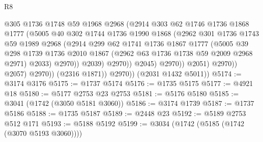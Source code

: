 \begin{lexlean}{R8}
\begin{coremodule}
                                @305
                                @1736
                                @1748
                                @59
                                @1968
                                @2968
                                (@2914
                                  @303
                                  @62
                                  @1746
                                  @1736
                                  @1868
                                  @1777
                                  (@5005
                                    @40
                                    @302
                                    @1744
                                    @1736
                                    @1990
                                    @1868
                                    (@2962
                                      @301
                                      @1736
                                      @1743
                                      @59
                                      @1989
                                      @2968
                                      (@2914
                                        @299
                                        @62
                                        @1741
                                        @1736
                                        @1867
                                        @1777
                                        (@5005
                                          @39
                                          @298
                                          @1739
                                          @1736
                                          @2010
                                          @1867
                                          (@2962 @63 @1736 @1738 @59 @2009 @2968 @2971)
                                          @2033)
                                        @2970))
                                    @2039)
                                  @2970))
                              @2045)
                            @2970))
                        @2051)
                      @2970))
                  @2057)
                @2970))
            (@2316 @1871))
          @2970))
      (@2031 @1432 @5011))
@5174 := @3174 @3176
@5175 := @1737 @5174
@5176 := @1735 @5175
@5177 := @4921 @18
@5180 := @5177 @2753 @23 @2753
@5181 := @5176 @5180
@5185 := @3041 (@1742 (@3050 @5181 @3060))
@5186 := @3174 @1739
@5187 := @1737 @5186
@5188 := @1735 @5187
@5189 := @2448 @23
@5192 := @5189 @2753 @512 @171
@5193 := @5188 @5192
@5199 := @3034 (@1742 (@5185 (@1742 (@3070 @5193 @3060))))

\end{coremodule}
\end{lexlean}
